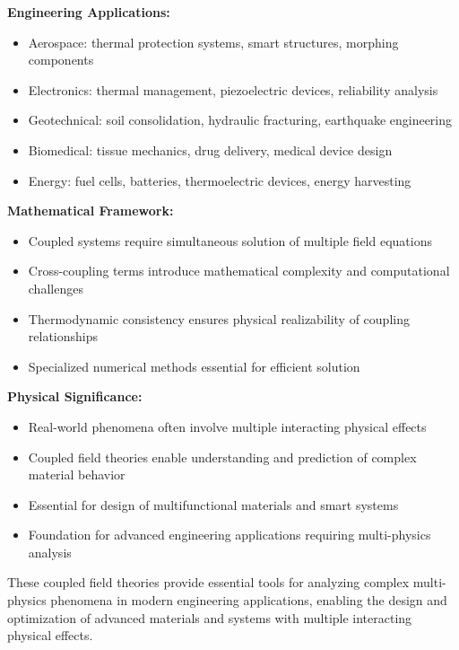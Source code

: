 \begin{subox}[Summary]
\textbf{Engineering Applications:}
\begin{itemize}
\item Aerospace: thermal protection systems, smart structures, morphing components
\item Electronics: thermal management, piezoelectric devices, reliability analysis
\item Geotechnical: soil consolidation, hydraulic fracturing, earthquake engineering
\item Biomedical: tissue mechanics, drug delivery, medical device design
\item Energy: fuel cells, batteries, thermoelectric devices, energy harvesting
\end{itemize}

\textbf{Mathematical Framework:}
\begin{itemize}
\item Coupled systems require simultaneous solution of multiple field equations
\item Cross-coupling terms introduce mathematical complexity and computational challenges
\item Thermodynamic consistency ensures physical realizability of coupling relationships
\item Specialized numerical methods essential for efficient solution
\end{itemize}

\textbf{Physical Significance:}
\begin{itemize}
\item Real-world phenomena often involve multiple interacting physical effects
\item Coupled field theories enable understanding and prediction of complex material behavior
\item Essential for design of multifunctional materials and smart systems
\item Foundation for advanced engineering applications requiring multi-physics analysis
\end{itemize}

These coupled field theories provide essential tools for analyzing complex multi-physics phenomena in modern engineering applications, enabling the design and optimization of advanced materials and systems with multiple interacting physical effects.
\end{subox}